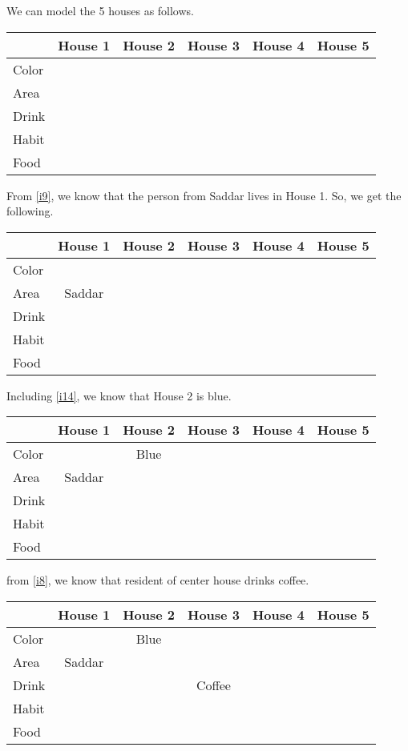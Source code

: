 \documentclass[a4paper]{exam}
\newcommand\cb{\color{blue}}
\begin{document}
\begin{questions}
  \begin{solution}
    We can model the 5 houses as follows.
    
    \begin{tabular}{l||*5{c|}}
      & \textbf{House 1} & \textbf{House 2} & \textbf{House 3} & \textbf{House 4} & \textbf{House 5} \\
      \hline\hline
      Color & & & & & \\\hline
      Area & & & & & \\\hline
      Drink & & & & & \\\hline
      Habit & & & & & \\\hline
      Food & & & & & \\\hline
    \end{tabular}

    From \ref{i9}, we know that the person from Saddar lives in House 1. So, we get the following.\\
    \begin{tabular}{l||*5{c|}}
      & \textbf{House 1} & \textbf{House 2} & \textbf{House 3} & \textbf{House 4} & \textbf{House 5} \\
      \hline\hline
      Color & & & & & \\\hline
      Area & Saddar & & & & \\\hline
      Drink & & & & & \\\hline
      Habit & & & & & \\\hline
      Food & & & & & \\\hline
    \end{tabular}

    Including \ref{i14}, we know that House 2 is blue.\\
    \begin{tabular}{l||*5{c|}}
      & \textbf{House 1} & \textbf{\cb House 2} & \textbf{House 3} & \textbf{House 4} & \textbf{House 5} \\
      \hline\hline
      Color & & Blue & & & \\\hline
      Area & Saddar & & & & \\\hline
      Drink & & & & & \\\hline
      Habit & & & & & \\\hline
      Food & & & & & \\\hline
    \end{tabular}

    from \ref{i8}, we know that resident of center house drinks coffee.\\
    \begin{tabular}{l||*5{c|}}
      & \textbf{House 1} & \textbf{\cb House 2} & \textbf{House 3} & \textbf{House 4} & \textbf{House 5} \\
      \hline\hline
      Color & & Blue & & & \\\hline
      Area & Saddar & & & & \\\hline
      Drink & & & Coffee & & \\\hline
      Habit & & & & & \\\hline
      Food & & & & & \\\hline
    \end{tabular}


\end{solution}
\end{questions}
\end{document}
